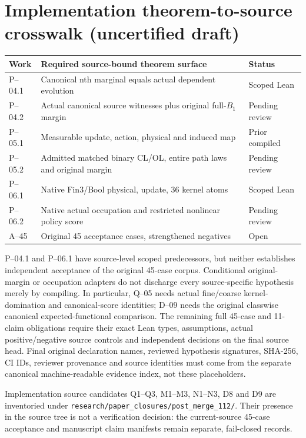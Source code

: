 \section{Implementation theorem-to-source crosswalk (uncertified draft)}
\begin{longtable}{@{}p{22mm}p{94mm}p{22mm}@{}}\toprule
Work&Required source-bound theorem surface&Status\\\midrule\endhead
P--04.1&Canonical nth marginal equals actual dependent evolution&Scoped Lean\\
P--04.2&Actual canonical source witnesses plus original full-$B_1$ margin&Pending review\\
P--05.1&Measurable update, action, physical and induced map&Prior compiled\\
P--05.2&Admitted matched binary CL/OL, entire path laws and original margin&Pending review\\
P--06.1&Native Fin3/Bool physical, update, 36 kernel atoms&Scoped Lean\\
P--06.2&Native actual occupation and restricted nonlinear policy score&Pending review\\
A--45&Original 45 acceptance cases, strengthened negatives&Open\\
\bottomrule\end{longtable}
P--04.1 and P--06.1 have source-level scoped predecessors, but neither
establishes independent acceptance of the original 45-case corpus.
Conditional original-margin or occupation adapters do not discharge every
source-specific hypothesis merely by compiling. In particular, Q--05 needs
actual fine/coarse kernel-domination and canonical-score identities; D--09
needs the original classwise canonical expected-functional comparison.
The remaining full 45-case and 11-claim obligations require their exact
Lean types, assumptions, actual positive/negative source controls and
independent decisions on the final source head.
Final original declaration names, reviewed hypothesis signatures, SHA-256,
CI IDs, reviewer provenance and source identities must come from the
separate canonical machine-readable evidence index, not these placeholders.


Implementation source candidates Q1--Q3, M1--M3, N1--N3, D8 and D9
are inventoried under \texttt{research/paper\_closures/post\_merge\_112/}.
Their presence in the source tree is not a verification decision: the
current-source 45-case acceptance and manuscript claim manifests remain
separate, fail-closed records.
